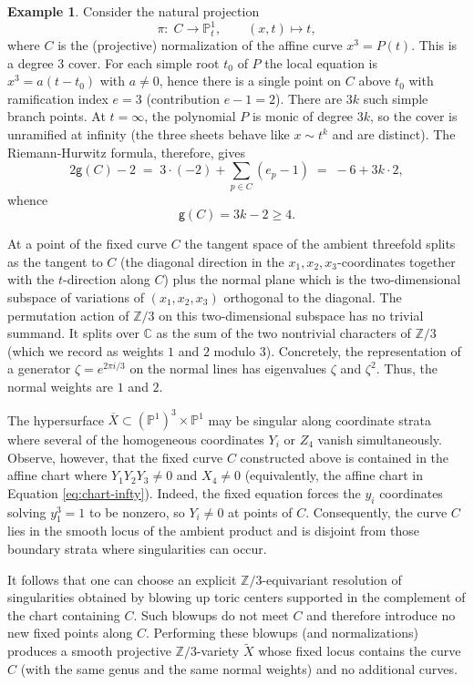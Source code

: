 \documentclass[12pt,a4paper]{amsart}
\theoremstyle{definition}
\newtheorem{example}[theorem]{Example}
\theoremstyle{remark}
\begin{document}
\begin{example}
Consider the natural projection
\[
\pi:\; C\longrightarrow \mathbb{P}^1_t,\qquad (x,t)\mapsto t,
\]
where $C$ is the (projective) normalization of the affine curve $x^3=P(t)$. This is a degree $3$ cover. For each simple root $t_0$ of $P$ the local equation is $x^3=a(t-t_0)$ with $a\neq0$, hence there is a single point on $C$ above $t_0$ with ramification index $e=3$ (contribution $e-1=2$). There are $3k$ such simple branch points. At $t=\infty$, the polynomial $P$ is monic of degree $3k$, so the cover is unramified at infinity (the three sheets behave like $x\sim t^k$ and are distinct). The Riemann-Hurwitz formula, therefore, gives
\[
2\mathsf{g}(C)-2 \;=\; 3\cdot(-2) + \sum_{p\in C}(e_p-1) \;=\; -6 + 3k\cdot 2,
\]
whence
\[
\mathsf{g}(C)=3k-2\ge 4.
\]

At a point of the fixed curve $C$ the tangent space of the ambient threefold splits as the tangent to $C$ (the diagonal direction in the $x_1,x_2,x_3$-coordinates together with the $t$-direction along $C$) plus the normal plane which is the two-dimensional subspace of variations of $(x_1,x_2,x_3)$ orthogonal to the diagonal. The permutation action of $\mathbb{Z}/3$ on this two-dimensional subspace has no trivial summand. It splits over $\mathbb{C}$ as the sum of the two nontrivial characters of $\mathbb{Z}/3$ (which we record as weights $1$ and $2$ modulo $3$). Concretely, the representation of a generator $\zeta=e^{2\pi i/3}$ on the normal lines has eigenvalues $\zeta$ and $\zeta^2$. Thus, the normal weights are $1$ and $2$.

The hypersurface $\overline X\subset(\mathbb{P}^1)^3\times\mathbb{P}^1$ may be singular along coordinate strata where several of the homogeneous coordinates $Y_i$ or $Z_4$ vanish simultaneously. Observe, however, that the fixed curve $C$ constructed above is contained in the affine chart where $Y_1Y_2Y_3\neq0$ and $X_4\neq0$ (equivalently, the affine chart in Equation \eqref{eq:chart-infty}). Indeed, the fixed equation forces the $y_i$ coordinates solving $y_1^3=1$ to be nonzero, so $Y_i\neq0$ at points of $C$. Consequently, the curve $C$ lies in the smooth locus of the ambient product and is disjoint from those boundary strata where singularities can occur.

It follows that one can choose an explicit $\mathbb{Z}/3$-equivariant resolution of singularities obtained by blowing up toric centers supported in the complement of the chart containing $C$. Such blowups do not meet $C$ and therefore introduce no new fixed points along $C$. Performing these blowups (and normalizations) produces a smooth projective $\mathbb{Z}/3$-variety $\widetilde X$ whose fixed locus contains the curve $C$ (with the same genus and the same normal weights) and no additional curves.


\end{example}
\end{document}
